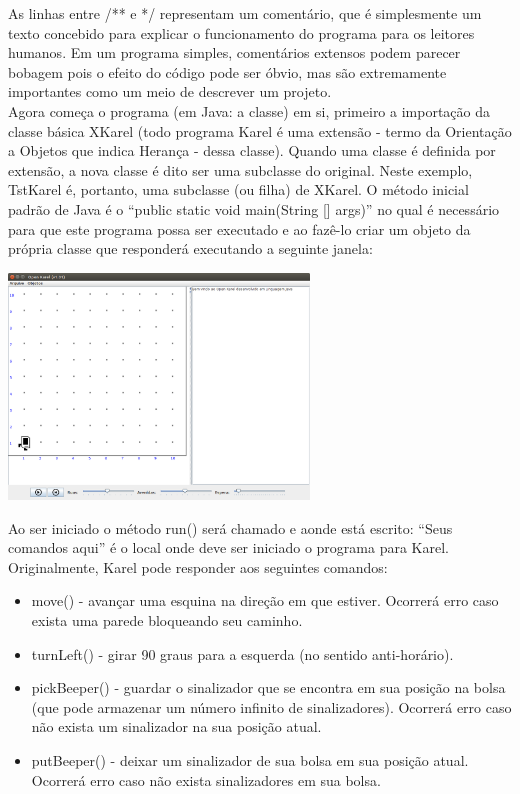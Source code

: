 \documentclass[a4paper,11pt]{article}
\begin{document}
As linhas entre /** e */ representam um comentário, que é simplesmente um texto concebido para explicar o funcionamento do programa para os leitores humanos. Em um programa simples, comentários extensos podem parecer bobagem pois o efeito do código pode ser óbvio, mas são extremamente importantes como um meio de descrever um projeto. \\[3mm]
Agora começa o programa (em Java: a classe) em si, primeiro a importação da classe básica XKarel (todo programa Karel é uma extensão - termo da Orientação a Objetos que indica Herança - dessa classe). Quando uma classe é definida por extensão, a nova classe é dito ser uma subclasse do original. Neste exemplo, TstKarel é, portanto, uma subclasse (ou filha) de XKarel. O método inicial padrão de Java é o ``public static void main(String [] args)'' no qual é necessário para que este programa possa ser executado e ao fazê-lo criar um objeto da própria classe que responderá executando a seguinte janela:
\begin{center} 
\includegraphics[width=0.6\textwidth]{janinicial.png} 
\end{center}
Ao ser iniciado o método run() será chamado e aonde está escrito: ``Seus comandos aqui'' é o local onde deve ser iniciado o programa para Karel. 
Originalmente, Karel pode responder aos seguintes comandos:
\begin{itemize}
 \item move() - avançar uma esquina na direção em que estiver. Ocorrerá erro caso exista uma parede bloqueando seu caminho.
 \item turnLeft() - girar 90 graus para a esquerda (no sentido anti-horário).
 \item pickBeeper() - guardar o sinalizador que se encontra em sua posição na bolsa (que pode armazenar um número infinito de sinalizadores). Ocorrerá erro caso não exista um sinalizador na sua posição atual.
 \item putBeeper() - deixar um sinalizador de sua bolsa em sua posição atual. Ocorrerá erro caso não exista sinalizadores em sua bolsa.
\end{itemize} 
\end{document}
